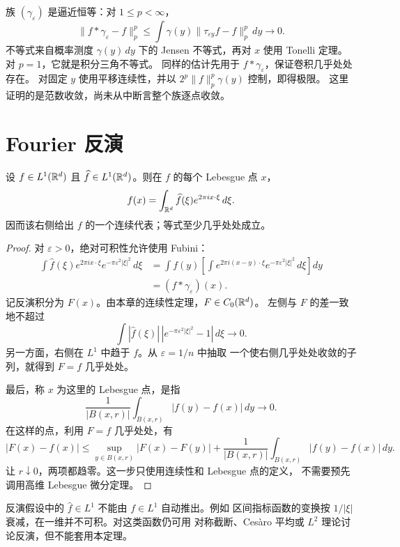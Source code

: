 族 \((\gamma_\varepsilon)\) 是逼近恒等：对 \(1\le p<\infty\)，
\[
 \|f*\gamma_\varepsilon-f\|_p^p
 \le\int\gamma(y)\|\tau_{\varepsilon y}f-f\|_p^p\,dy\longrightarrow0.
\]
不等式来自概率测度 \(\gamma(y)\,dy\) 下的 Jensen 不等式，再对 \(x\)
使用 Tonelli 定理。对 \(p=1\)，它就是积分三角不等式。
同样的估计先用于 \(f*\gamma_\varepsilon\)，保证卷积几乎处处存在。
对固定 \(y\) 使用平移连续性，并以
\(2^p\|f\|_p^p\gamma(y)\) 控制，即得极限。
这里证明的是范数收敛，尚未从中断言整个族逐点收敛。

\section{Fourier 反演}

\begin{theorem}\label{thm:fourier-inversion-lone}
设 \(f\in L^1(\mathbb{R}^d)\) 且 \(\widehat f\in L^1(\mathbb{R}^d)\)。则在 \(f\) 的每个
Lebesgue 点 \(x\)，
\[
 f(x)=\int_{\mathbb{R}^d}\widehat f(\xi)e^{2\pi ix\cdot\xi}\,d\xi.
\]
因而该右侧给出 \(f\) 的一个连续代表；等式至少几乎处处成立。
\end{theorem}
\begin{proof}
对 \(\varepsilon>0\)，绝对可积性允许使用 Fubini：
\begin{align*}
 \int \widehat f(\xi)e^{2\pi ix\cdot\xi}
       e^{-\pi\varepsilon^2|\xi|^2}\,d\xi
 &=\int f(y)\left[\int
 e^{2\pi i(x-y)\cdot\xi}e^{-\pi\varepsilon^2|\xi|^2}\,d\xi\right]dy\\
 &=(f*\gamma_\varepsilon)(x).
\end{align*}
记反演积分为 \(F(x)\)。由本章的连续性定理，\(F\in C_0(\mathbb{R}^d)\)。
左侧与 \(F\) 的差一致地不超过
\[
 \int|\widehat f(\xi)|\,|e^{-\pi\varepsilon^2|\xi|^2}-1|\,d\xi
 \longrightarrow0.
\]
另一方面，右侧在 \(L^1\) 中趋于 \(f\)。从 \(\varepsilon=1/n\) 中抽取
一个使右侧几乎处处收敛的子列，就得到 \(F=f\) 几乎处处。

最后，称 \(x\) 为这里的 Lebesgue 点，是指
\[
 \frac1{|B(x,r)|}\int_{B(x,r)}|f(y)-f(x)|\,dy\longrightarrow0.
\]
在这样的点，利用 \(F=f\) 几乎处处，有
\[
 |F(x)-f(x)|\le
 \sup_{y\in B(x,r)}|F(x)-F(y)|
 +\frac1{|B(x,r)|}\int_{B(x,r)}|f(y)-f(x)|\,dy.
\]
让 \(r\downarrow0\)，两项都趋零。这一步只使用连续性和 Lebesgue 点的定义，
不需要预先调用高维 Lebesgue 微分定理。
\end{proof}

反演假设中的 \(\widehat f\in L^1\) 不能由 \(f\in L^1\) 自动推出。例如
区间指标函数的变换按 \(1/|\xi|\) 衰减，在一维并不可积。对这类函数仍可用
对称截断、Cesàro 平均或 \(L^2\) 理论讨论反演，但不能套用本定理。


